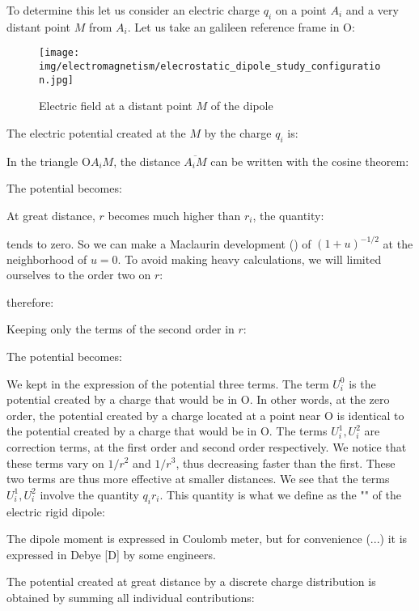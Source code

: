 	To determine this let us consider an electric charge $q_i$ on a point $A_i$ and a very distant point $M$ from $A_i$. Let us take an galileen reference frame in O:
	\begin{figure}[H]
		\centering
		\texttt{[image: img/electromagnetism/elecrostatic\_dipole\_study\_configuration.jpg]}
		\caption{Electric field at a distant point $M$ of the dipole}
	\end{figure}
	The electric potential created at the $M$ by the charge $q_i$ is:
	
	In the triangle $\text{O}A_i M$, the distance $\overline{A_i M}$ can be written with the cosine theorem:
	
	The potential becomes:
	
	At great distance, $r$ becomes much higher than $r_i$, the quantity:
	
	tends to zero. So we can make a Maclaurin development () of $(1+u)^{-1/2}$ at the neighborhood of $u=0$. To avoid making heavy calculations, we will limited ourselves to the order two on $r$:
	
	therefore:
	
	Keeping only the terms of the second order in $r$:
	
	The potential becomes:
	
	We kept in the expression of the potential three terms. The term $U_i^0$ is the potential created by a charge that would be in O. In other words, at the zero order, the potential created by a charge located at a point near O is identical to the potential created by a charge that would be in O. The terms $U_i^1,U_i^2$ are correction terms, at the first order and second order respectively. We notice that these terms vary on $1/r^2$ and $1/r^3$, thus decreasing faster than the first. These two terms are thus more effective at smaller distances.
	We see that the terms $U_i^1,U_i^2$ involve the quantity $q_ir_i$. This quantity is what we define as the "" of the electric rigid dipole:
	
	\begin{tcolorbox}[title=Remark,colframe=black,arc=10pt]
	The dipole moment is expressed in Coulomb meter, but for convenience (...) it is expressed in Debye [D] by some engineers.
	\end{tcolorbox}
	The potential created at great distance by a discrete charge distribution is obtained by summing all individual contributions:
	
